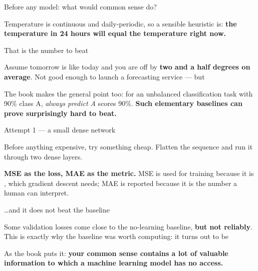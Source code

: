 \documentclass[aspectratio=169,11pt,t]{beamer}
\begin{document}

\begin{frame}[shrink=25]{Before any model: what would common sense do?}
{\fontsize{9.4}{12.6}\selectfont\color{fg2}Temperature is continuous and daily-periodic, so a sensible heuristic is: \textbf{the temperature in 24 hours will equal the temperature right now.}\par}\vskip 4pt
\end{frame}

\begin{frame}[shrink=25]{That is the number to beat}
\begin{iband}[signal]
Assume tomorrow is like today and you are off by \textbf{two and a half degrees on average}. Not good enough to launch a forecasting service --- but 
\end{iband}
{\fontsize{9.4}{12.6}\selectfont\color{fg2}The book makes the general point too: for an unbalanced classification task with 90\% class A, \textit{always predict A} scores 90\%. \textbf{Such elementary baselines can prove surprisingly hard to beat.}\par}\vskip 4pt
\end{frame}

\begin{frame}[shrink=25]{Attempt 1 --- a small dense network}
{\fontsize{9.4}{12.6}\selectfont\color{fg2}Before anything expensive, try something cheap. Flatten the sequence and run it through two dense layers.\par}\vskip 4pt
\begin{iband}[signal]
\textbf{MSE as the loss, MAE as the metric.} MSE is used for training because it is , which gradient descent needs; MAE is reported because it is the number a human can interpret.
\end{iband}
\end{frame}

\begin{frame}[shrink=25]{\ldots{}and it does not beat the baseline}
\begin{iband}[rose]
Some validation losses come close to the no-learning baseline, \textbf{but not reliably}. This is exactly why the baseline was worth computing: it turns out to be 
\end{iband}
{\fontsize{9.4}{12.6}\selectfont\color{fg2}As the book puts it: \textbf{your common sense contains a lot of valuable information to which a machine learning model has no access.}\par}\vskip 4pt
\end{frame}
\end{document}
